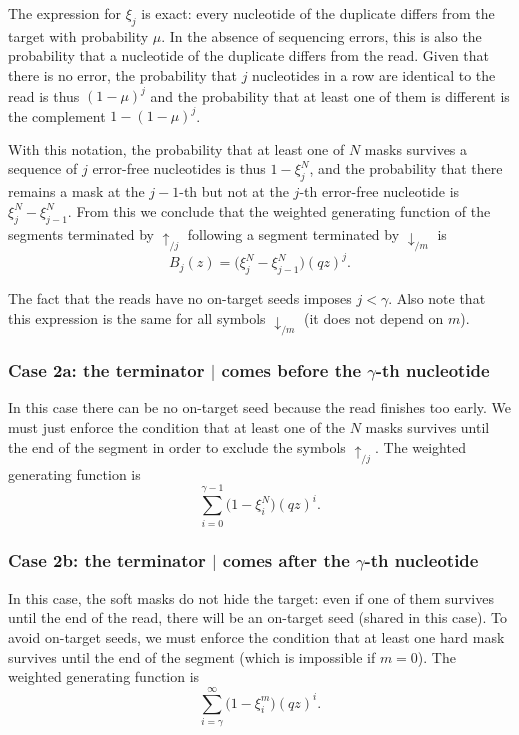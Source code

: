 \documentclass{article}
\begin{document}
The expression for $\xi_j$ is exact: every nucleotide of the duplicate
differs from the target with probability $\mu$. In the absence of
sequencing errors, this is also the probability that a nucleotide of the
duplicate differs from the read. Given that there is no error, the
probability that $j$ nucleotides in a row are identical to the read is
thus $(1-\mu)^j$ and the probability that at least one of them is
different is the complement $1-(1-\mu)^j$.

With this notation, the probability that at least one of $N$ masks
survives a sequence of $j$ error-free nucleotides is thus $1-\xi_j^N$, and
the probability that there remains a mask at the $j-1$-th but not at the
$j$-th error-free nucleotide is $\xi_j^N - \xi_{j-1}^N$. From this we
conclude that the weighted generating function of the segments terminated
by $\uparrow_{/j}$ following a segment terminated by $\downarrow_{/m}$ is
\begin{equation}
\label{eq:B}
B_j(z) = \Big( \xi_j^N-\xi_{j-1}^N \Big) (qz)^j.
\end{equation}

The fact that the reads have no on-target seeds imposes $j < \gamma$. Also
note that this expression is the same for all symbols $\downarrow_{/m}$
(it does not depend on $m$).

\subsubsection*{Case 2a: the terminator $|$ comes before the $\gamma$-th
nucleotide}

In this case there can be no on-target seed because the read finishes
too early. We must just enforce the condition that at least one of the $N$
masks survives until the end of the segment in order to exclude the
symbols $\uparrow_{/j}$. The weighted generating function is
\begin{equation*}
\sum_{i=0}^{\gamma-1} \Big(1 - \xi_i^N \Big) (qz)^i.
\end{equation*}

\subsubsection*{Case 2b: the terminator $|$ comes after the $\gamma$-th
nucleotide}

In this case, the soft masks do not hide the target: even if one of them
survives until the end of the read, there will be an on-target seed
(shared in this case). To avoid on-target seeds, we must enforce the
condition that at least one hard mask survives until the end of the
segment (which is impossible if $m = 0$). The weighted generating function
is
\begin{equation*}
\sum_{i=\gamma}^\infty \Big(1 - \xi_i^m \Big) (qz)^i.
\end{equation*}
\end{document}
